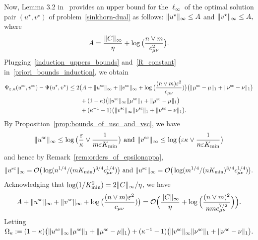 Now, Lemma 3.2 in~\cite{lin2019} provides an upper bound for the $\ell_\infty$ of the optimal solution pair $(u^\star, v^\star)$ of problem~\eqref{sinkhorn-dual} as follows:
$\|u^\star\|_\infty \leq A$ and $\|v^\star\|_\infty\leq A,$ where 
\begin{align}
\label{R_constant}
A = \frac{\|C\|_\infty}{\eta} + \log\big(\frac{n\vee m}{c^2_{\mu\nu}}\big).
\end{align}
Plugging~\eqref{induction_uppers_bounds} and~\eqref{R_constant} in~\eqref{priori_bounds_induction}, we obtain
\begin{align}
\Psi_{\varepsilon, \kappa}(u^{\text{sc}} ,v^{\text{sc}}) -\Psi(u^\star, v^\star) 
&\leq 2\big(A + \|u^{\text{sc}}\|_\infty +  \|v^{\text{sc}}\|_\infty + \log\big(\frac{(n\vee m)\varepsilon^2}{c_{\mu\nu}})\big) \big(\|\mu^{\text{sc}} - \mu\|_1+ \|\nu^{\text{sc}} - \nu\|_1\big)\nonumber\\
&\qquad + (1- \kappa)\big(\|{u}^{\text{sc}}\|_\infty\|{\mu}^{\text{sc}}\|_1 +\|\mu^{\text{sc}} - \mu\|_1\big)\label{post_bounds_induction_2}\\
&\qquad  + (\kappa^{-1} - 1)\big(\|{v}^{\text{sc}}\|_\infty\|{\nu}^{\text{sc}}\|_1+\|\nu^{\text{sc}} - \nu\|_1\big)\nonumber.
\end{align}
By Proposition~\ref{prop:bounds_of_usc_and_vsc}, we have 
\begin{align*} 
\|u^{\text{sc}}\|_\infty \leq \log\big(\frac \varepsilon\kappa\vee \frac{1}{m\varepsilon K_{\min}}\big) \text{ and } \|v^{\text{sc}}\|_\infty \leq \log\big(\varepsilon\kappa \vee \frac{1}{n\varepsilon K_{\min} }\big)
\end{align*}
and hence by Remark~\ref{rem:orders_of_epsilonappa}, 
\begin{equation*}
\|u^{\text{sc}}\|_\infty = \mathcal{O}\big(\log({n^{1/4}}/{(mK_{\min})^{3/4}c_{\mu\nu}^{1/4}})\big) \text{ and }\|u^{\text{sc}}\|_\infty =\mathcal{O}\big(\log({m^{1/4}}/{(nK_{\min})^{3/4}c_{\mu\nu}^{1/4}})\big).
\end{equation*}
Acknowledging that $\log(1/ K_{\min}^2) = 2\|C\|_\infty/\eta$, we have 
\begin{align*}
A + \|u^{\text{sc}}\|_\infty  + \|v^{\text{sc}}\|_\infty + \log\big(\frac{(n\vee m)\varepsilon^2}{c_{\mu\nu}})\big) = \mathcal{O}\Big(\frac{\|C\|_\infty}{\eta} + \log\Big(\frac{(n\vee m)^2}{nmc_{\mu\nu}^{7/2}}\Big)\Big).
\end{align*}
Letting $\Omega_{\kappa} := (1- \kappa)\big(\|{u}^{\text{sc}}\|_\infty\|{\mu}^{\text{sc}}\|_1 +\|\mu^{\text{sc}} - \mu\|_1\big) + (\kappa^{-1} - 1)\big(\|{v}^{\text{sc}}\|_\infty\|{\nu}^{\text{sc}}\|_1+\|\nu^{\text{sc}} - \nu\|_1\big).$

